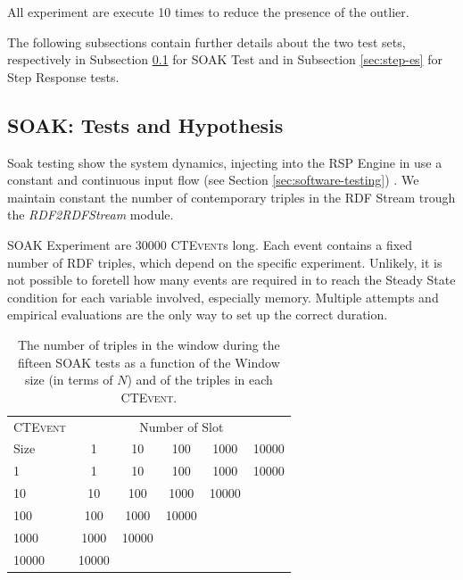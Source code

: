 All experiment are execute 10 times to reduce the presence of the outlier.

The following subsections contain further details about the two test sets, respectively in Subsection \ref{sec:soak-es} for SOAK Test and in Subsection \ref{sec:step-es} for Step Response tests.

\subsection{SOAK: Tests and Hypothesis}\label{sec:soak-es}

Soak testing show the system dynamics, injecting into the RSP Engine in use a constant and continuous input flow (see Section \ref{sec:software-testing}) . We maintain constant the number of contemporary triples in the RDF Stream trough the \textit{RDF2RDFStream} module. %

SOAK Experiment are 30000 \textsc{CTEvent}s long. Each event contains a fixed number of RDF triples, which depend on the specific experiment. Unlikely, it is not possible to foretell how many events are required in to reach the Steady State condition for each variable involved, especially memory. Multiple attempts and empirical evaluations are the only way to set up the correct duration.

\begin{table}[htb]
\centering
\normalsize
 \begin{tabular}{l| ccccc}
	  	\hline
		\textsc{CTEvent}  &\multicolumn{5}{c}{Number of Slot}  \\
		Size  & 1 & 10 & 100 & 1000&10000 \\
		\hline	
		1 & 1& 10 & 100 & 1000&10000 \\
		10  & 10 & 100 & 1000&10000 \\
		100 & 100&1000&10000  \\
		1000 &1000 & 10000 \\
		10000&10000  \\
		\hline 
	\end{tabular}
	
	 \vspace{10pt}
	\caption{The number of triples in the window during the fifteen SOAK tests as a function of the Window size (in terms of $N$) and of the triples in each \textsc{CTEvent}.}
	\label{tab:soaktests}
\end{table}

